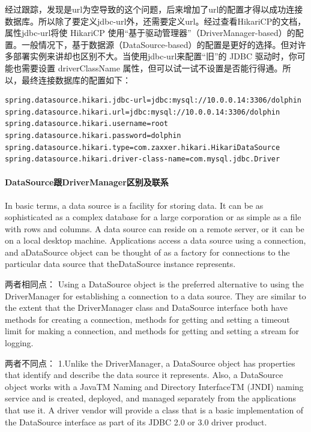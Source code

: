\documentclass[letter]{book}
\begin{document}
经过跟踪，发现是url为空导致的这个问题，后来增加了url的配置才得以成功连接数据库。所以除了要定义jdbc-url外，还需要定义url。经过查看HikariCP的文档，属性jdbc-url将使 HikariCP 使用“基于驱动管理器”（DriverManager-based）的配置。一般情况下，基于数据源（DataSource-based）的配置是更好的选择。但对许多部署实例来讲却也区别不大。当使用jdbc-url来配置“旧”的 JDBC 驱动时，你可能也需要设置 driverClassName 属性，但可以试一试不设置是否能行得通。所以，最终连接数据库的配置如下：

\begin{lstlisting}
spring.datasource.hikari.jdbc-url=jdbc:mysql://10.0.0.14:3306/dolphin
spring.datasource.hikari.url=jdbc:mysql://10.0.0.14:3306/dolphin
spring.datasource.hikari.username=root
spring.datasource.hikari.password=dolphin
spring.datasource.hikari.type=com.zaxxer.hikari.HikariDataSource
spring.datasource.hikari.driver-class-name=com.mysql.jdbc.Driver
\end{lstlisting}


\paragraph{DataSource跟DriverManager区别及联系}

In basic terms, a data source is a facility for storing data. It can be as sophisticated as a complex database for a large corporation or as simple as a file with rows and columns. A data source can reside on a remote server, or it can be on a local desktop machine. Applications access a data source using a connection, and aDataSource object can be thought of as a factory for connections to the particular data source that theDataSource instance represents.

两者相同点：
Using a DataSource object is the preferred alternative to using the DriverManager for establishing a connection to a data source. They are similar to the extent that the DriverManager class and DataSource interface both have methods for creating a connection, methods for getting and setting a timeout limit for making a connection, and methods for getting and setting a stream for logging.

两者不同点：
1.Unlike the DriverManager, a DataSource object has properties that identify and describe the data source it represents. Also, a DataSource object works with a JavaTM Naming and Directory InterfaceTM (JNDI) naming service and is created, deployed, and managed separately from the applications that use it. A driver vendor will provide a class that is a basic implementation of the DataSource interface as part of its JDBC 2.0 or 3.0 driver product.
\end{document}
